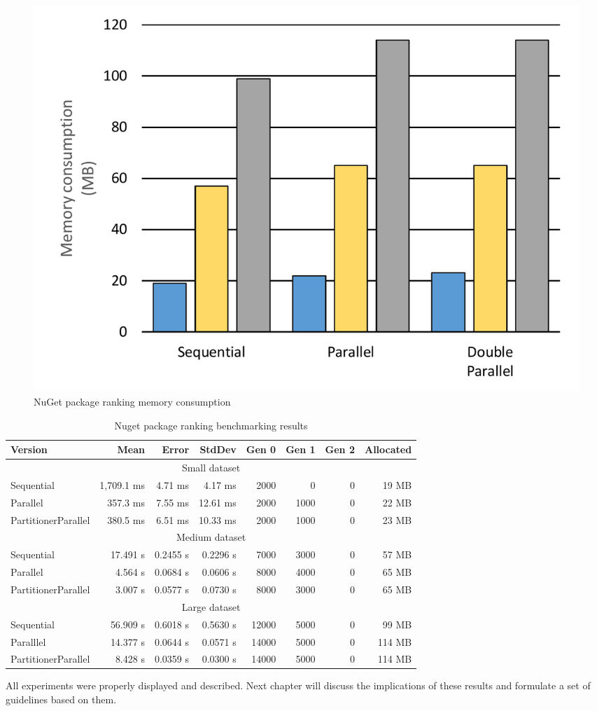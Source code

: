 \begin{figure}[htb]
\centering
\includegraphics[width=.8\linewidth]{figures04/NugetMemory.pdf}
\caption{NuGet package ranking memory consumption}
\label{fig: NugetMemory}
\end{figure}

\begin{table}[!ht]
    \centering
    \caption{Nuget package ranking benchmarking results}
		\label{tab: NugetBenchmarking}
    \begin{tabularx}{\linewidth}{Xrrrrrrr} \toprule
			\toprule
			\bfseries Version 	&
			\bfseries Mean    	&
			\bfseries Error	    &
			\bfseries StdDev	  &
			\bfseries Gen 0	    &
			\bfseries Gen 1	    &
			\bfseries Gen 2	    &
			\bfseries Allocated \\
			\midrule 
			\multicolumn{8}{c}{Small dataset} \\ 
			\midrule
			Sequential & 1,709.1 ms	& 4.71 ms	& 4.17 ms	& 2000 & 0 &    0 &	19 MB \\
			Parallel & 357.3 ms	& 7.55 ms	& 12.61 ms	& 2000 & 1000 &	0 &	22 MB \\
			PartitionerParallel & 380.5 ms	& 6.51 ms	& 10.33 ms	& 2000 & 1000 &	0 
&	23 MB \\
			\midrule
			\multicolumn{8}{c}{Medium dataset} \\ 
			\midrule
			Sequential & 17.491 s     &  0.2455 s &	0.2296 s& 7000 & 3000 &	0 &	57 
MB \\
			Parallel & 4.564 s	     & 0.0684 s	 &0.0606 s	& 8000 & 4000 &	0 &	65 
MB \\
			PartitionerParallel & 3.007 s	     & 0.0577 s	 &0.0730 s	& 8000 & 3000 
&	0 &	65 MB \\
			\midrule
      \multicolumn{8}{c}{Large dataset} \\ 
			\midrule
			Sequential    &      56.909 s &	0.6018 s &	0.5630 s &	12000 & 	5000 
&	0	& 99 MB  \\
			Paralllel     &      14.377 s &	0.0644 s &	0.0571 s &	14000 &	5000	 &
 0	& 114 MB \\
			PartitionerParallel &  8.428 s  &	0.0359 s &	0.0300 s &	14000 &	5000
	 &
 0	& 114 MB \\
			\bottomrule
    \end{tabularx}
\end{table}

All experiments were properly displayed and described. Next chapter will 
discuss the implications of these results and formulate a set of guidelines 
based on them. 


